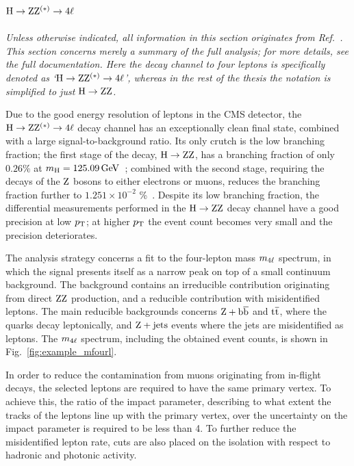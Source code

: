 \subsection{\texorpdfstring{$\mathrm{H}\to\mathrm{Z}\mathrm{Z}^{(\ast)}\to 4\ell$}{H to ZZ to four leptons}}

\emph{%
Unless otherwise indicated, all information in this section originates from Ref.~\cite{Sirunyan:2017exp}. This section concerns merely a summary of the full analysis; for more details, see the full documentation.
% 
Here the decay channel to four leptons is specifically denoted as `$\mathrm{H}\to\mathrm{Z}\mathrm{Z}^{(\ast)}\to 4\ell$', whereas in the rest of the thesis the notation is simplified to just $\mathrm{H}\to\mathrm{Z}\mathrm{Z}$.
}

Due to the good energy resolution of leptons in the CMS detector, the $\mathrm{H}\to\mathrm{Z}\mathrm{Z}^{(\ast)}\to 4\ell$ decay channel has an exceptionally clean final state, combined with a large signal-to-background ratio.
% 
Its only crutch is the low branching fraction; the first stage of the decay, $\mathrm{H}\to\mathrm{Z}\mathrm{Z}$, has a branching fraction of only $0.26\%$ at $m_{\mathrm{H}} = 125.09\,\text{GeV}$~\cite{deFlorian:2016spz}; combined with the second stage, requiring the decays of the $\mathrm{Z}$ bosons to either electrons or muons, reduces the branching fraction further to $1.251 \times 10^{-2}$ \%~\cite{deFlorian:2016spz}.
% 
Despite its low branching fraction, the differential measurements performed in the $\mathrm{H}\to\mathrm{Z}\mathrm{Z}$ decay channel have a good precision at low $p_\mathrm{T}$; at higher $p_\mathrm{T}$ the event count becomes very small and the precision deteriorates.


The analysis strategy concerns a fit to the four-lepton mass $m_{4\ell}$ spectrum, in which the signal presents itself as a narrow peak on top of a small continuum background.
% 
The background contains an irreducible contribution originating from direct $\mathrm{Z}\mathrm{Z}$ production, and a reducible contribution with misidentified leptons.
% 
The main reducible backgrounds concerns $\mathrm{Z} + \mathrm{b}\overline{\mathrm{b}}$ and $\mathrm{t}\overline{\mathrm{t}}$, where the quarks decay leptonically, and $\mathrm{Z} + \text{jets}$ events where the jets are misidentified as leptons.
% 
The $m_{4\ell}$ spectrum, including the obtained event counts, is shown in Fig.~\ref{fig:example_mfourl}.


In order to reduce the contamination from muons originating from in-flight decays, the selected leptons are required to have the same primary vertex.
% 
To achieve this, the ratio of the impact parameter, describing to what extent the tracks of the leptons line up with the primary vertex, over the uncertainty on the impact parameter is required to be less than 4.
% 
To further reduce the misidentified lepton rate, cuts are also placed on the isolation with respect to hadronic and photonic activity.


